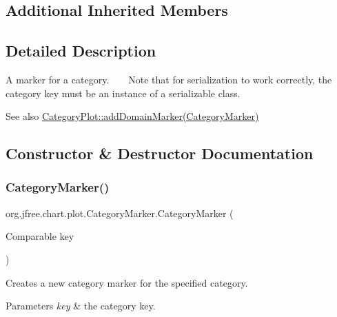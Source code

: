 \subsection*{Additional Inherited Members}


\subsection{Detailed Description}
A marker for a category. ~\newline
~\newline
 Note that for serialization to work correctly, the category key must be an instance of a serializable class.

\begin{DoxySeeAlso}{See also}
\mbox{\hyperlink{classorg_1_1jfree_1_1chart_1_1plot_1_1_category_plot_a2fb7552beaad280581bcd911d984d956}{Category\+Plot\+::add\+Domain\+Marker(\+Category\+Marker)}} 
\end{DoxySeeAlso}


\subsection{Constructor \& Destructor Documentation}
\mbox{\label{classorg_1_1jfree_1_1chart_1_1plot_1_1_category_marker_a754cdb5a49318c626690951db8f4a064}} 
\subsubsection{\texorpdfstring{Category\+Marker()}{CategoryMarker()}\hspace{0.1cm}{\footnotesize\ttfamily [1/3]}}
{\footnotesize\ttfamily org.\+jfree.\+chart.\+plot.\+Category\+Marker.\+Category\+Marker (\begin{DoxyParamCaption}\item[{Comparable}]{key }\end{DoxyParamCaption})}

Creates a new category marker for the specified category.


\begin{DoxyParams}{Parameters}
{\em key} & the category key. \\
\hline
\end{DoxyParams}
\mbox{\label{classorg_1_1jfree_1_1chart_1_1plot_1_1_category_marker_a42b35d6c2d67ea22901d062bbd28ffd5}} 
